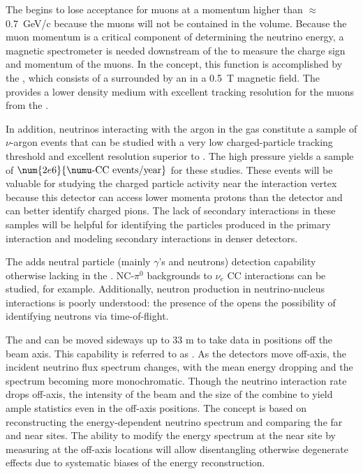 The  begins to lose acceptance for muons at a momentum higher than 
$\approx$0.7~GeV/c because the muons will not be contained in the  volume.  Because the muon momentum is a critical component of determining the neutrino energy, a magnetic spectrometer is needed downstream of the  to measure the charge sign and momentum of the muons.  In the   concept, this function is accomplished by the , which consists of a  surrounded by an  in a \SI{0.5}{T} magnetic field. The  provides a lower density medium with excellent tracking resolution for the muons from the .  

In addition, neutrinos interacting with the argon in the gas  constitute a sample of $\nu$-argon events that can be studied with a very low charged-particle tracking threshold and excellent resolution superior to . The high pressure yields a sample of $\num{2e6}{\numu \text{-CC events/year}}$ for these studies. These events will be valuable for studying the charged particle activity near the interaction vertex because this detector can access lower momenta protons than the  detector and can better identify charged pions.  The lack of secondary interactions in these samples will be helpful for identifying the particles produced in the primary interaction and modeling secondary interactions in denser detectors.

The  adds neutral particle (mainly $\gamma$'s and 
neutrons) detection capability otherwise lacking in the .
NC-$\pi^0$ backgrounds to $\nu_e$ CC interactions can be studied, 
for example.  
Additionally, neutron production in neutrino-nucleus interactions 
is poorly understood: the presence of the  
opens the possibility of identifying neutrons via time-of-flight.

The  and  can be moved sideways up to 33 m to take data in positions off the beam axis.  This capability is referred to as . As the detectors move off-axis, the incident neutrino flux spectrum changes, with the mean energy dropping and the spectrum becoming more monochromatic.  Though the neutrino interaction rate drops off-axis, the intensity of the beam and the size of the   combine to yield ample statistics even in the off-axis positions.
The  concept is based on reconstructing the energy-dependent neutrino spectrum and
comparing the far and near sites. The ability to modify the energy spectrum at the near site by measuring at the off-axis locations will allow disentangling otherwise degenerate effects due to systematic biases of the energy reconstruction.

